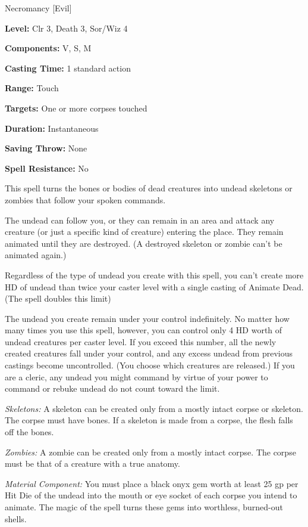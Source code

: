 
Necromancy [Evil]

\textbf{Level:} Clr 3, Death 3, Sor/Wiz 4

\textbf{Components:} V, S, M

\textbf{Casting Time:} 1 standard action

\textbf{Range:} Touch

\textbf{Targets:} One or more corpses touched

\textbf{Duration:} Instantaneous

\textbf{Saving Throw:} None

\textbf{Spell Resistance:} No

This spell turns the bones or bodies of dead creatures into undead skeletons or 
zombies that follow your spoken commands.

The undead can follow you, or they can remain in an area and attack any creature 
(or just a specific kind of creature) entering the place. They remain animated 
until they are destroyed. (A destroyed skeleton or zombie can't be animated again.)

Regardless of the type of undead you create with this spell, you can't create more 
HD of undead than twice your caster level with a single casting of Animate Dead. (The  spell doubles this limit)

The undead you create remain under your control indefinitely. No matter how many 
times you use this spell, however, you can control only 4 HD worth of undead creatures 
per caster level. If you exceed this number, all the newly created creatures fall 
under your control, and any excess undead from previous castings become uncontrolled. 
(You choose which creatures are released.) If you are a cleric, any undead you 
might command by virtue of your power to command or rebuke undead do not count 
toward the limit.

\textit{Skeletons:} A skeleton can be created only from a mostly intact corpse 
or skeleton. The corpse must have bones. If a skeleton is made from a corpse, the 
flesh falls off the bones. 

\textit{Zombies:} A zombie can be created only from a mostly intact corpse. The 
corpse must be that of a creature with a true anatomy.

\textit{Material Component:} You must place a black onyx gem worth at least 25 
gp per Hit Die of the undead into the mouth or eye socket of each corpse you intend 
to animate. The magic of the spell turns these gems into worthless, burned-out 
shells.


